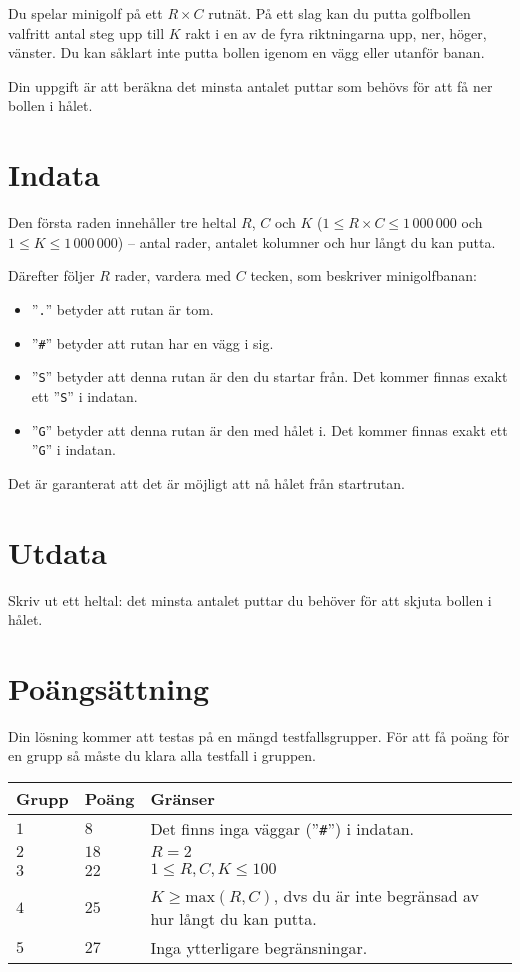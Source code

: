 

Du spelar minigolf på ett $R\times C$ rutnät.
På ett slag kan du putta golfbollen valfritt antal steg upp till $K$ rakt i en av de fyra riktningarna upp, ner, höger, vänster. Du kan såklart inte putta bollen igenom en vägg eller utanför banan.

Din uppgift är att beräkna det minsta antalet puttar som behövs för att få ner bollen i hålet.

\section*{Indata}
Den första raden innehåller tre heltal $R$, $C$ och $K$
($1 \le R\times C \le 1\,000\,000$ och $1\le K \le 1\,000\,000$) -- antal rader, antalet kolumner och hur långt du kan putta.

Därefter följer $R$ rader, vardera med $C$ tecken, som beskriver minigolfbanan:
\begin{itemize}
  \item ”\verb!.!” betyder att rutan är tom.
  \item ”\verb!#!” betyder att rutan har en vägg i sig.
  \item ”\verb!S!” betyder att denna rutan är den du startar från. Det kommer finnas exakt ett ”\verb!S!” i indatan.
  \item ”\verb!G!” betyder att denna rutan är den med hålet i. Det kommer finnas exakt ett ”\verb!G!” i indatan.
\end{itemize}

Det är garanterat att det är möjligt att nå hålet från startrutan.

\section*{Utdata}
Skriv ut ett heltal: det minsta antalet puttar du behöver för att skjuta bollen i hålet.

\section*{Poängsättning}
Din lösning kommer att testas på en mängd testfallsgrupper.
För att få poäng för en grupp så måste du klara alla testfall i gruppen.

\noindent
\begin{tabular}{| l | l | l |}
  \hline
  \textbf{Grupp} & \textbf{Poäng} & \textbf{Gränser} \\ \hline
  $1$   & $8$        & Det finns inga väggar (”\verb!#!”) i indatan. \\ \hline
  $2$   & $18$       & $R = 2$ \\ \hline
  $3$   & $22$       & $1\le R,C,K\le 100$ \\ \hline
  $4$   & $25$       & $K \ge \text{max}(R,C)$, dvs du är inte begränsad av hur långt du kan putta. \\ \hline
  $5$   & $27$       & Inga ytterligare begränsningar. \\ \hline
\end{tabular}


